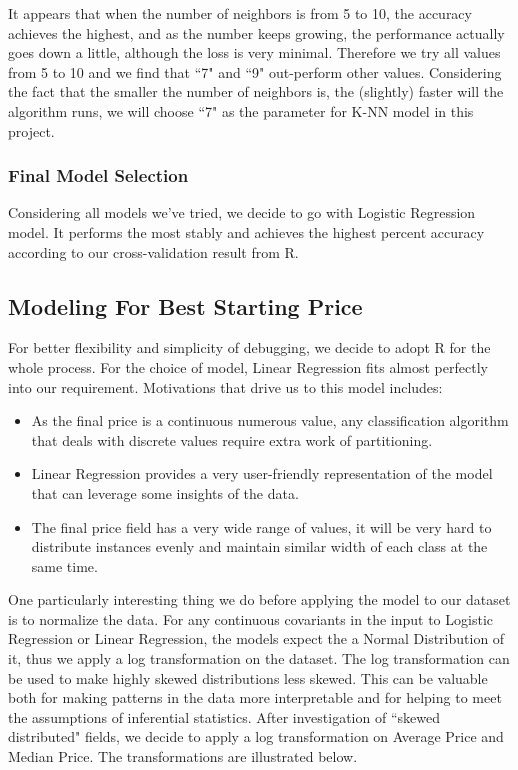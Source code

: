 \documentclass[CEJM,PDF]{cej} %
\begin{document}
It appears that when the number of neighbors is from 5 to 10, the accuracy achieves the highest, and as the number keeps growing, the performance actually goes down a little, although the loss is very minimal. Therefore we try all values from 5 to 10 and we find that ``7" and ``9" out-perform other values. Considering the fact that the smaller the number of neighbors is, the (slightly) faster will the algorithm runs, we will choose ``7" as the parameter for K-NN model in this project.\\

\subsubsection{Final Model Selection}
Considering all models we've tried, we decide to go with Logistic Regression model. It performs the most stably and achieves the highest percent accuracy according to our cross-validation result from R.\\

\subsection{Modeling For Best Starting Price}
For better flexibility and simplicity of debugging, we decide to adopt R for the whole process. For the choice of model, Linear Regression fits almost perfectly into our requirement. Motivations that drive us to this model includes:
\begin{itemize}
\item As the final price is a continuous numerous value, any classification algorithm that deals with discrete values require extra work of partitioning.
\item Linear Regression provides a very user-friendly representation of the model that can leverage some insights of the data.
\item The final price field has a very wide range of values, it will be very hard to distribute instances evenly and maintain similar width of each class at the same time.
\end{itemize}

One particularly interesting thing we do before applying the model to our dataset is to normalize the data. For any continuous covariants in the input to Logistic Regression or Linear Regression, the models expect the a Normal Distribution of it, thus we apply a log transformation on the dataset. The log transformation can be used to make highly skewed distributions less skewed. This can be valuable both for making patterns in the data more interpretable and for helping to meet the assumptions of inferential statistics. After investigation of ``skewed distributed" fields, we decide to apply a log transformation on Average Price and Median Price. The transformations are illustrated below.\\
\end{document}
